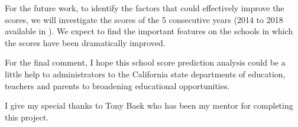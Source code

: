 \documentclass[11pt]{article}
\begin{document}
For the future work,
to identify the factors that could effectively improve the scores, we will investigate the scores of the 5 consecutive years (2014 to 2018 available in \cite{california_dep_education}). 
%
We expect to find the important features on the schools in which the scores have been dramatically improved.
%

For the final comment, I hope this school score prediction analysis could be a little help to administrators to the California state departments of education, teachers and parents to broadening educational opportunities.

I give my special thanks to Tony Baek who has been my mentor for completing this project.

\newpage



%
%
\end{document}
